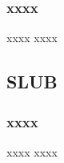 \begin{frame}[plain,t]
    
    \frametitle{xxxx}
    
    
    \begin{block}{xxxx}
        xxxx

    \end{block} 
    
    
    \begin{figure}
        \centering
    \end{figure}
    
\end{frame}
\subsection{SLUB} %

\begin{frame}[plain,t]
    
    \frametitle{xxxx}
    
    
    \begin{block}{xxxx}
        xxxx

    \end{block} 
    
    
    \begin{figure}
        \centering
    \end{figure}
    
\end{frame}


